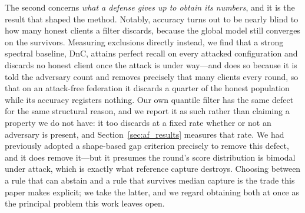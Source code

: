 \documentclass[journal]{IEEEtran}
\begin{document}
The second concerns \emph{what a defense gives up to obtain its numbers}, and it is the result that shaped the method. Notably, accuracy turns out to be nearly blind to how many honest clients a filter discards, because the global model still converges on the survivors. Measuring exclusions directly instead, we find that a strong spectral baseline, DnC, attains perfect recall on every attacked configuration and discards no honest client once the attack is under way---and does so because it is told the adversary count and removes precisely that many clients every round, so that on an attack-free federation it discards a quarter of the honest population while its accuracy registers nothing. Our own quantile filter has the same defect for the same structural reason, and we report it as such rather than claiming a property we do not have: it too discards at a fixed rate whether or not an adversary is present, and Section~\ref{sec:af_results} measures that rate. We had previously adopted a shape-based gap criterion precisely to remove this defect, and it does remove it---but it presumes the round's score distribution is bimodal under attack, which is exactly what reference capture destroys. Choosing between a rule that can abstain and a rule that survives median capture is the trade this paper makes explicit; we take the latter, and we regard obtaining both at once as the principal problem this work leaves open.
\end{document}
